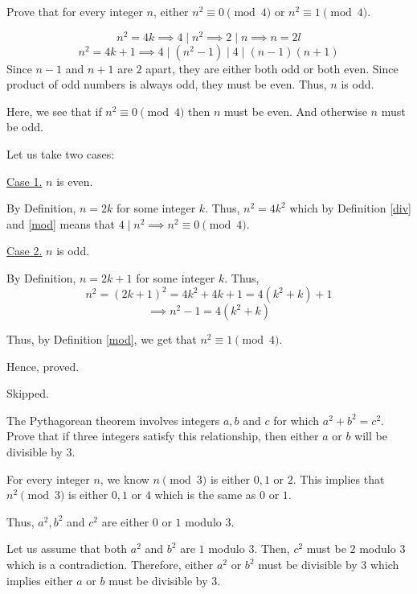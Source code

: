 \bp 
	Prove that for every integer $n$, either $n^2 \equiv 0 \pmod{4}$ or $n^2 \equiv 1 \pmod{4}$.
\ep 

\begin{scratch}
	$$n^2 = 4k \implies 4 \mid n^2 \implies 2 \mid n \implies n = 2l$$
	$$n^2 = 4k + 1 \implies 4 \mid (n^2-1) \mid 4 \mid (n-1)(n+1)$$
	Since $n-1$ and $n+1$ are $2$ apart, they are either both odd or both even.
	Since product of odd numbers is always odd, they must be even.
	Thus, $n$ is odd.

	Here, we see that if $n^2 \equiv 0 \pmod{4}$ then $n$ must be even. And otherwise $n$ must be odd.
\end{scratch}

\bs
	Let us take two cases:

	\underline{Case 1.} $n$ is even.

	By Definition, $n = 2k$ for some integer $k$. Thus, $n^2 = 4k^2$ which by Definition \ref{div} and \ref{mod} means that $4 \mid n^2 \implies n^2 \equiv 0 \pmod{4}$.

	\underline{Case 2.} $n$ is odd.

	By Definition, $n = 2k+1$ for some integer $k$. Thus, 
	$$n^2 = (2k+1)^2 = 4k^2 + 4k + 1 = 4(k^2+k) + 1$$
	$$\implies n^2 - 1 = 4(k^2+k)$$

	Thus, by Definition \ref{mod},  we get that $n^2 \equiv 1 \pmod{4}$.

	Hence, proved.
\es


\bp Skipped.\ep 

\bp 
	The Pythagorean theorem involves integers $a, b$ and $c$ for which $a^2 + b^2 = c^2$. Prove that if three integers satisfy this relationship, then either $a$ or $b$ will be divisible by $3$.
\ep 

\begin{scratch}
	For every integer $n$, we know $n \pmod{3}$ is either $0,1$ or $2$.
	This implies that $n^2 \pmod{3}$ is either $0, 1$ or $4$ which is the same as $0$ or $1$.

	Thus, $a^2, b^2$ and $c^2$ are either $0$ or $1$ modulo $3$.

	Let us assume that both $a^2$ and $b^2$ are $1$ modulo $3$. Then, $c^2$ must be $2$ modulo $3$ which is a contradiction.
	Therefore, either $a^2$ or $b^2$ must be divisible by $3$ which implies either $a$ or $b$ must be divisible by $3$.
\end{scratch}

